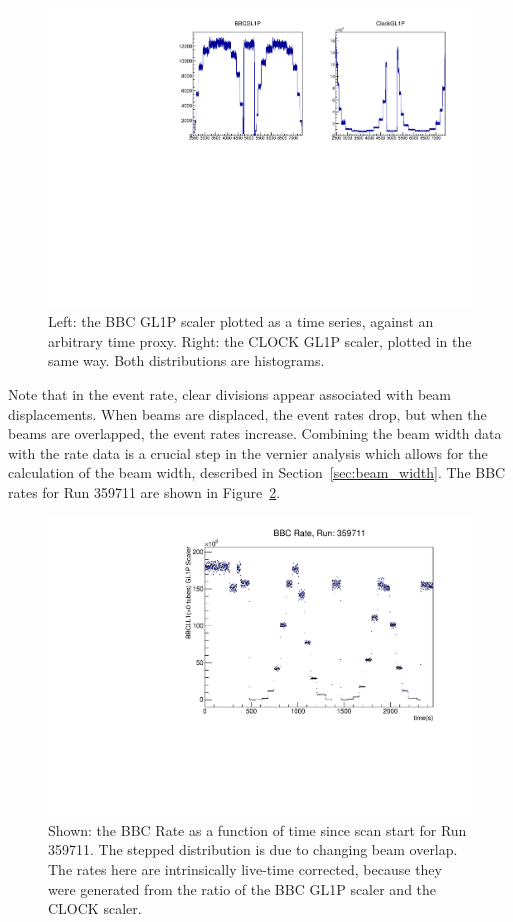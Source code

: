 \begin{figure}
  \centering
  \includegraphics[width=0.8\linewidth]{./figures/bbc_gl1_scalers.pdf}
  \caption{
    Left: the BBC GL1P scaler plotted as a time series, against an arbitrary
    time proxy. Right: the CLOCK GL1P scaler, plotted in the same way. Both
    distributions are histograms. 
  }
  \label{fig:bbc_gl1p_scaler}
\end{figure}

Note that in the event rate, clear divisions appear associated with beam
displacements. When beams are displaced, the event rates drop, but when the
beams are overlapped, the event rates increase. Combining the beam width data
with the rate data is a crucial step in the vernier analysis which allows for
the calculation of the beam width, described in Section~\ref{sec:beam_width}.
The BBC rates for Run 359711 are shown in Figure~\ref{fig:bbc_rate_359711}.

\begin{figure}
  \centering
  \includegraphics[width=0.8\linewidth]{./figures/bbc_rate_359711.pdf}
  \caption{
    Shown: the BBC Rate as a function of time since scan start for Run 359711.
    The stepped distribution is due to changing beam overlap. The rates here are
    intrinsically live-time corrected, because they were generated from the
    ratio of the BBC GL1P scaler and the CLOCK scaler.
  }
  \label{fig:bbc_rate_359711}
\end{figure}

